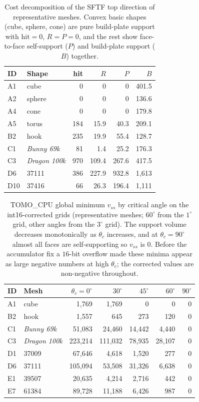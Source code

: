 \documentclass[11pt,a4paper]{article}
\begin{document}
\begin{table}[H]
\centering
\caption{Cost decomposition of the SFTF top direction of representative meshes.
Convex basic shapes (cube, sphere, cone) are pure build-plate support with hit$=0$, $R=P=0$,
and the rest show face-to-face self-support ($P$) and build-plate support ($B$) together.}
\label{stab:fivegroup-structure}
\begin{tabular}{llrrrr}
\toprule
ID & Shape & hit & $R$ & $P$ & $B$\\
\midrule
A1  & cube     & 0   & 0       & 0        & 401.5\\
A2  & sphere   & 0   & 0       & 0        & 136.6\\
A4  & cone     & 0   & 0       & 0        & 179.8\\
A5  & torus    & 184 & 15.9    & 40.3     & 209.1\\
B2  & hook     & 235 & 19.9    & 55.4     & 128.7\\
C1  & \emph{Bunny 69k}    & 81  & 1.4     & 25.2     & 176.3\\
C3  & \emph{Dragon 100k}   & 970 & 109.4   & 267.6    & 417.5\\
D6  & 37111    & 386 & 227.9   & 932.8    & 1{,}613\\
D10 & 37416    & 66  & 26.3    & 196.4    & 1{,}111\\
\bottomrule
\end{tabular}
\end{table}

\begin{table}[H]
\footnotesize
\centering
\caption{TOMO\_CPU global minimum $v_{ss}$ by critical angle on the int16-corrected grids (representative meshes; $60^\circ$ from the $1^\circ$ grid, other angles from the $3^\circ$ grid).
The support volume decreases monotonically as $\theta_c$ increases, and at $\theta_c{=}90^\circ$ almost all faces are self-supporting so $v_{ss}$ is $0$.
Before the accumulator fix a $16$-bit overflow made these minima appear as large negative numbers at high $\theta_c$; the corrected values are non-negative throughout.}
\label{stab:critangle}
\begin{tabular}{llrrrrr}
\toprule
ID & Mesh & $\theta_c{=}0^\circ$ & $30^\circ$ & $45^\circ$ & $60^\circ$ & $90^\circ$\\
\midrule
A1 & cube & 1{,}769 & 1{,}769 & 0 & 0 & 0\\
B2 & hook & 1{,}557 & 645 & 273 & 120 & 0\\
C1 & \emph{Bunny 69k} & 51{,}083 & 24{,}460 & 14{,}442 & 4{,}440 & 0\\
C3 & \emph{Dragon 100k} & 223{,}214 & 111{,}032 & 78{,}935 & 28{,}107 & 0\\
D1 & 37009 & 67{,}646 & 4{,}618 & 1{,}520 & 277 & 0\\
D6 & 37111 & 105{,}094 & 53{,}508 & 31{,}326 & 6{,}638 & 0\\
E1 & 39507 & 20{,}635 & 4{,}214 & 2{,}716 & 442 & 0\\
E7 & 61384 & 89{,}728 & 11{,}188 & 6{,}426 & 987 & 0\\
\bottomrule
\end{tabular}
\end{table}
\end{document}

